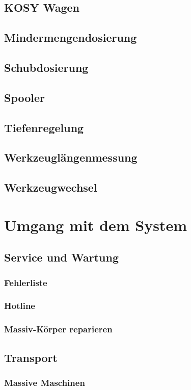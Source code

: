 \documentclass[a5paper]{book}
\begin{document}
	\section{KOSY Wagen} 
	\section{Mindermengendosierung} 
	\section{Schubdosierung} 
	\section{Spooler} 
	\section{Tiefenregelung} 
	\section{Werkzeuglängenmessung} 
	\section{Werkzeugwechsel} 

\chapter{Umgang mit dem System}
	\section{Service und Wartung} 
		\subsection{Fehlerliste} 
		\subsection{Hotline} 
		\subsection{Massiv-Körper reparieren} 
	\section{Transport} 
		\subsection{Massive Maschinen} 
\end{document}
